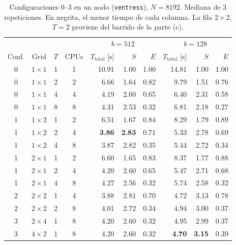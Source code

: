 \documentclass[11pt,a4paper]{article}
\newcommand{\Ttot}{T_{\text{total}}}
\begin{document}
\begin{table}[H]
\centering\small
\caption{Configuraciones 0--3 en un nodo (\texttt{ventress}), $N=8192$. Mediana de 3 repeticiones. En negrita, el menor tiempo de cada columna. La fila $2\times2$, $T=2$ proviene del barrido de la parte (c).}
\label{tab:d}
\begin{tabular}{cccc|rrr|rrr}
\toprule
 & & & & \multicolumn{3}{c|}{$b=512$} & \multicolumn{3}{c}{$b=128$} \\
Conf. & Grid & $T$ & CPUs & $\Ttot$ [s] & $S$ & $E$ & $\Ttot$ [s] & $S$ & $E$ \\
\midrule
0 & $1\times1$ & 1 & 1 & 10.91 & 1.00 & 1.00 & 14.81 & 1.00 & 1.00 \\
0 & $1\times1$ & 2 & 2 & 6.66 & 1.64 & 0.82 & 9.79 & 1.51 & 0.76 \\
0 & $1\times1$ & 4 & 4 & 4.19 & 2.60 & 0.65 & 6.40 & 2.31 & 0.58 \\
0 & $1\times1$ & 8 & 8 & 4.31 & 2.53 & 0.32 & 6.81 & 2.18 & 0.27 \\
\midrule
1 & $1\times2$ & 1 & 2 & 6.51 & 1.67 & 0.84 & 8.29 & 1.79 & 0.89 \\
1 & $1\times2$ & 2 & 4 & \textbf{3.86} & \textbf{2.83} & 0.71 & 5.33 & 2.78 & 0.69 \\
1 & $1\times2$ & 4 & 8 & 3.87 & 2.82 & 0.35 & 5.44 & 2.72 & 0.34 \\
1 & $2\times1$ & 1 & 2 & 6.60 & 1.65 & 0.83 & 8.37 & 1.77 & 0.88 \\
1 & $2\times1$ & 2 & 4 & 4.20 & 2.60 & 0.65 & 5.47 & 2.71 & 0.68 \\
1 & $2\times1$ & 4 & 8 & 4.27 & 2.56 & 0.32 & 5.74 & 2.58 & 0.32 \\
\midrule
2 & $2\times2$ & 1 & 4 & 3.88 & 2.81 & 0.70 & 4.72 & 3.13 & 0.78 \\
2 & $2\times2$ & 2 & 8 & 4.01 & 2.72 & 0.34 & 4.94 & 3.00 & 0.37 \\
\midrule
3 & $2\times4$ & 1 & 8 & 4.20 & 2.60 & 0.32 & 4.95 & 2.99 & 0.37 \\
3 & $4\times2$ & 1 & 8 & 4.20 & 2.60 & 0.32 & \textbf{4.70} & \textbf{3.15} & 0.39 \\
\bottomrule
\end{tabular}
\end{table}
\end{document}
